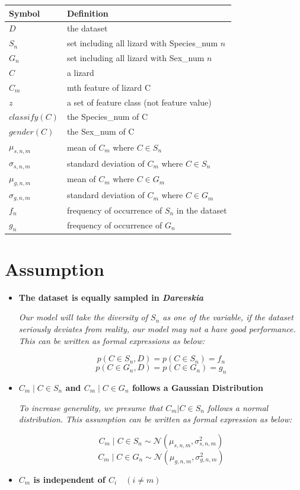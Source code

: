 \documentclass[12pt]{article}
\begin{document}
	\begin{tabular}{l l}
		\hline
		Symbol & Definition \\
		\hline
		$D$ & the dataset \\
		$S_{n}$ & set including all lizard with Species\_num $n$ \\
		$G_n$ & set including all lizard with Sex\_num $n$ \\
		$C$ & a lizard \\
		$C_m$ & m\-th feature of lizard C \\
		$z$ & a set of feature class (not feature value) \\
		$classify(C)$ & the Species\_num of C \\
		$gender(C)$ & the Sex\_num of C \\
		$\mu_{s, n, m}$ & mean of $C_m$ where $C \in S_n$ \\
		$\sigma_{s, n, m}$ & standard deviation of $C_m$ where $C \in S_n$ \\
		$\mu_{g, n, m}$ & mean of $C_m$ where $C \in G_m$ \\
		$\sigma_{g, n, m}$ & standard deviation of $C_m$ where $C \in G_m$ \\
		$f_n$ & frequency of occurrence of $S_n$ in the dataset \\
		$g_{n}$ & frequency of occurrence of $G_n$ \\
		\hline
	\end{tabular}

\section{Assumption}

	\begin{itemize}
		
		\item
			\textbf{The dataset is equally sampled in \textit{Darevskia}}
			
			\textit{Our model will take the diversity of $S_n$ as one of the variable,
			if the dataset seriously deviates from reality, our model may not a have
			good performance. This can be written as formal expressions as below:}
			
			$$p(C \in S_n, D) = p(C \in S_n) = f_n$$
			$$p(C \in G_n, D) = p(C \in G_n) = g_{n}$$
		
		\item
			\textbf{$C_m \mid C \in S_n$ and $C_m \mid C \in G_n$ follows a Gaussian Distribution}
			
			\textit{To increase generality, we presume that $C_m | C \in S_n$
			follows a normal distribution. This assumption can be written as formal expression
			as below:}
			
			$$C_m \mid C \in S_n \sim \mathcal{N}(\mu_{s, n, m}, \sigma^2_{s, n, m})$$
			$$C_m \mid C \in G_n \sim \mathcal{N}(\mu_{g, n, m}, \sigma^2_{g, n, m})$$
		
		\item
			\textbf{$C_m$ is independent of $C_i \quad (i \neq m)$}
		
	\end{itemize}
\end{document}
